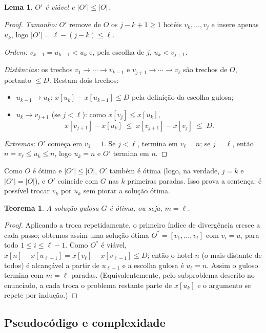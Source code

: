 \documentclass[11pt,a4paper]{article}
\newtheorem{lema}{Lema}
\newtheorem{teorema}{Teorema}
\begin{document}
\begin{lema}
$O'$ é viável e $|O'| \le |O|$.
\end{lema}
\begin{proof}
\emph{Tamanho:} $O'$ remove de $O$ os $j-k+1 \ge 1$ hotéis $v_k,\dots,v_j$ e
insere apenas $u_k$, logo $|O'| = \ell - (j-k) \le \ell$.

\emph{Ordem:} $v_{k-1}=u_{k-1}<u_k$ e, pela escolha de $j$, $u_k < v_{j+1}$.

\emph{Distâncias:} os trechos $v_1\to\cdots\to v_{k-1}$ e
$v_{j+1}\to\cdots\to v_\ell$ são trechos de $O$, portanto $\le D$. Restam dois trechos:
\begin{itemize}
  \item $u_{k-1}\to u_k$: $x[u_k]-x[u_{k-1}] \le D$ pela definição da escolha gulosa;
  \item $u_k \to v_{j+1}$ (se $j<\ell$): como $x[v_j] \le x[u_k]$,
        \[ x[v_{j+1}] - x[u_k] \;\le\; x[v_{j+1}] - x[v_j] \;\le\; D. \]
\end{itemize}
\emph{Extremos:} $O'$ começa em $v_1=1$. Se $j<\ell$, termina em $v_\ell=n$;
se $j=\ell$, então $n = v_\ell \le u_k \le n$, logo $u_k=n$ e $O'$ termina em $n$.
\end{proof}

Como $O$ é ótima e $|O'|\le|O|$, $O'$ também é ótima (logo, na verdade, $j=k$ e
$|O'|=|O|$), e $O'$ coincide com $G$ nas $k$ primeiras paradas. Isso prova a
sentença: é possível trocar $v_k$ por $u_k$ sem piorar a solução ótima.

\begin{teorema}
A solução gulosa $G$ é ótima, ou seja, $m = \ell$.
\end{teorema}
\begin{proof}
Aplicando a troca repetidamente, o primeiro índice de divergência cresce a cada
passo; obtemos assim uma solução ótima $O^*=[v_1,\dots,v_\ell]$ com $v_i=u_i$
para todo $1\le i\le \ell-1$. Como $O^*$ é viável, $x[n]-x[u_{\ell-1}] =
x[v_\ell]-x[v_{\ell-1}] \le D$; então o hotel $n$ (o mais distante de todos) é
alcançável a partir de $u_{\ell-1}$ e a escolha gulosa é $u_\ell = n$. Assim o
guloso termina com $m=\ell$ paradas. (Equivalentemente, pelo subproblema descrito no
enunciado, a cada troca o problema restante parte de $x[u_k]$ e o argumento se
repete por indução.)
\end{proof}

\subsection{Pseudocódigo e complexidade}
\end{document}
